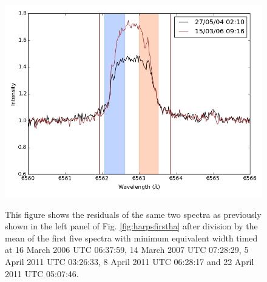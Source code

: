 \begin{figure}[!htbp]
\begin{center}
\includegraphics[scale=0.25]{Figures/harpsfirsthad5.png} \\
\end{center}   
\caption{This figure shows the residuals of the same two spectra as previously shown in the left panel of
 Fig. \ref{fig:harpsfirstha} after division by the mean of the first five spectra with minimum equivalent width
timed at 16 March 2006 UTC 06:37:59, 14 March 2007 UTC 07:28:29, 5 April 2011 UTC 03:26:33, 8 April 2011 UTC 06:28:17
and 22 April 2011 UTC 05:07:46.}
\protect\label{fig:harpsfirsthad5}
\end{figure}

